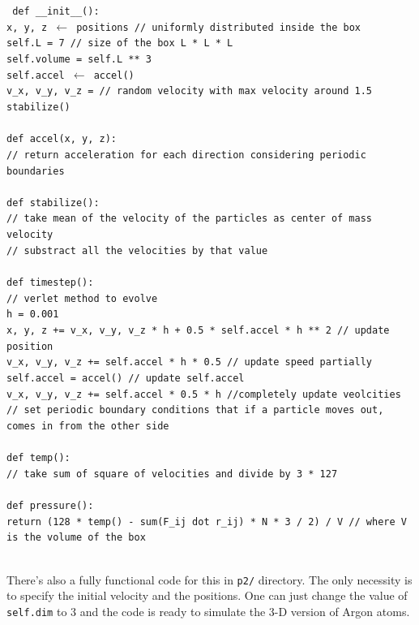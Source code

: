 \documentclass[12pt, a4paper]{article}
\begin{document}
	\noindent\texttt{
	\noindent def \_\_init\_\_():\\
	x, y, z $\leftarrow$ positions // uniformly distributed inside the box\\
	self.L = 7  // size of the box L * L * L\\
	self.volume = self.L ** 3 \\
	self.accel $\leftarrow$ accel() \\ 
	v\_x, v\_y, v\_z = // random velocity with max velocity around 1.5\\ 
	stabilize()\\ \\
	def accel(x, y, z):\\
		// return acceleration for each direction considering periodic boundaries\\ \\
	def stabilize():\\
		// take mean of the velocity of the particles as center of mass velocity\\
		// substract all the velocities by that value\\ \\
	def timestep():\\
		// verlet method to evolve\\
		h = 0.001\\
		x, y, z += v\_x, v\_y, v\_z * h + 0.5 * self.accel * h ** 2 // update position\\
		v\_x, v\_y, v\_z += self.accel * h * 0.5 // update speed partially\\
		self.accel = accel() // update self.accel \\
		v\_x, v\_y, v\_z += self.accel * 0.5 * h //completely update veolcities\\ 
		// set periodic boundary conditions that if a particle moves out, comes in from the other side\\ \\
		def temp():\\
		// take sum of square of velocities and divide by 3 * 127 \\ \\
		def pressure():\\
		return (128 * temp() - sum(F\_ij dot r\_ij) * N * 3 / 2) / V // where V is the volume of the box\\ \\
	}

	There's also a fully functional code for this in \texttt{p2/} directory. The only necessity is to specify the initial velocity and the positions. One can 
	just change the value of \texttt{self.dim} to $3$ and the code is ready to simulate the 3-D version of Argon atoms.
\end{document}
